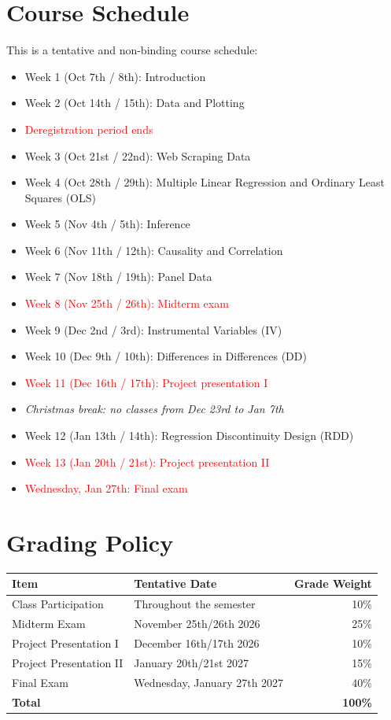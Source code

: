 \documentclass[11pt]{article}
\begin{document}
\section{Course Schedule} This is a tentative and non-binding course schedule: 
\begin{itemize} 
    \item Week 1 (Oct 7th / 8th): Introduction 
    \item Week 2 (Oct 14th / 15th): Data and Plotting 
    \item[\textcolor{red}{$\rightarrow$}] \textcolor{red}{Deregistration period ends} 
    \item Week 3 (Oct 21st / 22nd): Web Scraping Data 
    \item Week 4 (Oct 28th / 29th): Multiple Linear Regression and Ordinary Least Squares (OLS) 
    \item Week 5 (Nov 4th / 5th): Inference 
    \item Week 6 (Nov 11th / 12th): Causality and Correlation 
    \item Week 7 (Nov 18th / 19th): Panel Data 
    \item[\textcolor{red}{$\rightarrow$}] \textcolor{red}{Week 8 (Nov 25th / 26th): Midterm exam} 
    \item Week 9 (Dec 2nd / 3rd): Instrumental Variables (IV) 
    \item Week 10 (Dec 9th / 10th): Differences in Differences (DD) 
    \item[\textcolor{red}{$\rightarrow$}] \textcolor{red}{Week 11 (Dec 16th / 17th): Project presentation I}
    \item[] \textit{Christmas break: no classes from Dec 23rd to Jan 7th}
    \item Week 12 (Jan 13th / 14th): Regression Discontinuity Design (RDD) 
    \item[\textcolor{red}{$\rightarrow$}] \textcolor{red}{Week 13 (Jan 20th / 21st): Project presentation II}
    \item[\textcolor{red}{$\rightarrow$}] \textcolor{red}{Wednesday, Jan 27th: Final exam}
\end{itemize}

\section{Grading Policy}
\begin{tabular}{llr}
    \toprule
    \textbf{Item} & \textbf{Tentative Date} & \textbf{Grade Weight} \\
    \midrule
    Class Participation & Throughout the semester & 10\% \\
    Midterm Exam & November 25th/26th 2026 & 25\% \\
    Project Presentation I & December 16th/17th 2026 & 10\% \\
    Project Presentation II & January 20th/21st 2027 & 15\% \\
    Final Exam & Wednesday, January 27th 2027 & 40\% \\
    \midrule
    \textbf{Total} & & \textbf{100\%} \\
    \bottomrule
\end{tabular}
\end{document}
